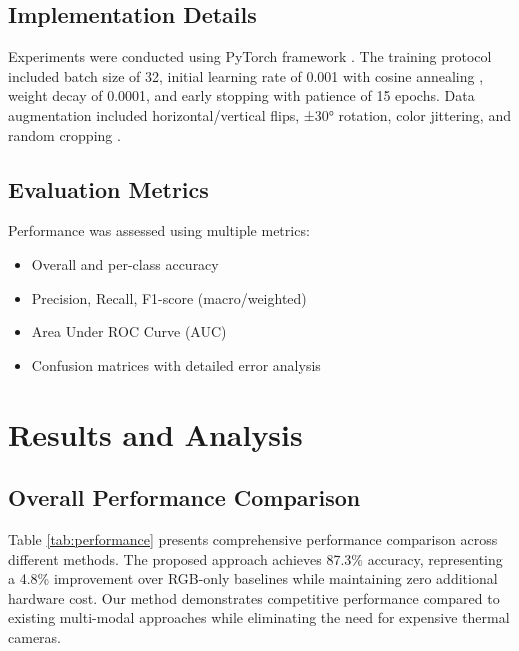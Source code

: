 \documentclass[conference]{IEEEtran}
\begin{document}
\subsection{Implementation Details}

Experiments were conducted using PyTorch framework \cite{paszke2019}. The training protocol included batch size of 32, initial learning rate of 0.001 with cosine annealing \cite{loschilov2017}, weight decay of 0.0001, and early stopping with patience of 15 epochs. Data augmentation included horizontal/vertical flips, ±30° rotation, color jittering, and random cropping \cite{shorten2019}.

\subsection{Evaluation Metrics}

Performance was assessed using multiple metrics:
\begin{itemize}
    \item Overall and per-class accuracy
    \item Precision, Recall, F1-score (macro/weighted)
    \item Area Under ROC Curve (AUC)
    \item Confusion matrices with detailed error analysis
\end{itemize}

\section{Results and Analysis}

\subsection{Overall Performance Comparison}

Table \ref{tab:performance} presents comprehensive performance comparison across different methods. The proposed approach achieves 87.3\% accuracy, representing a 4.8\% improvement over RGB-only baselines while maintaining zero additional hardware cost. Our method demonstrates competitive performance compared to existing multi-modal approaches while eliminating the need for expensive thermal cameras.
\end{document}
